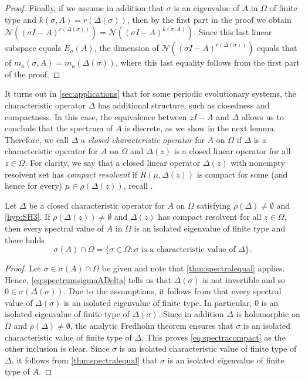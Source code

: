\documentclass[english]{myarticle}
\begin{document}
\begin{sloppypar}
\begin{proof}
Finally, if we assume in addition that $\sigma$ is an eigenvalue of $A$ in $\Omega$ of finite type and $k(\sigma,A) = r(\Delta(\sigma))$, then by the first part in the proof we obtain $\mathcal{N}((\sigma I - A)^{r(\Delta(\sigma))}) = \mathcal{N}((\sigma I - A)^{k(\sigma,A)})$. Since this last linear subspace equals $E_\sigma(A)$, the dimension of $\mathcal{N}((\sigma I - A)^{r(\Delta(\sigma))})$ equals that of $m_a(\sigma,A) = m_a(\Delta(\sigma))$, where this last equality follows from the first part of the proof.
\end{proof}
 
It turns out in \cref{sec:applications} that for some periodic evolutionary systems, the characteristic operator $\Delta$ has additional structure, such as closedness and compactness. In this case, the equivalence between $zI - A$ and $\Delta$ allows us to conclude that the spectrum of $A$ is discrete, as we show in the next lemma. Therefore, we call $\Delta$ a \emph{closed characteristic operator} for $A$ on $\Omega$ if $\Delta$ is a characteristic operator for $A$ on $\Omega$ and $\Delta(z)$ is a closed linear operator for all $z \in \Omega$. For clarity, we say that a closed linear operator $\Delta(z)$ with nonempty resolvent set has \emph{compact resolvent} if $R(\mu,\Delta(z))$ is compact for some (and hence for every) $\mu \in \rho(\Delta(z))$, recall \cite[Definition II.4.24]{Engel2000}.

\begin{lemma} \label{lemma:compactspectra}
Let $\Delta$ be a closed characteristic operator for $A$ on $\Omega$ satisfying $\rho(\Delta) \neq \emptyset$ and \ref{hyp:SH3}. If $\rho(\Delta(z)) \neq \emptyset$ and 
$\Delta(z)$ has compact resolvent for all $z \in \Omega$, 
then every spectral value of $A$ in $\Omega$ is an isolated eigenvalue of finite type and there holds
\begin{equation} \label{eq:spectracompact}
    \sigma(A) \cap \Omega = \{ \sigma \in \Omega :  \sigma \text{ is a characteristic value of } \Delta \}.
\end{equation}
\end{lemma}
\begin{proof} Let $\sigma \in \sigma(A) \cap \Omega$ be given and note that \cref{thm:spectralequal} applies. Hence, \eqref{eq:spectrumsigmaADelta} tells us that $\Delta(\sigma)$ is not invertible and so $0 \in \sigma(\Delta(\sigma))$. Due to the assumptions, it follows from \cite[Corollary IV.1.19]{Engel2000} that every spectral value of $\Delta(\sigma)$ is an isolated eigenvalue of finite type. In particular, $0$ is an isolated eigenvalue of finite type of $\Delta(\sigma)$. Since in addition $\Delta$ is holomorphic on $\Omega$ and $\rho(\Delta) \neq \emptyset$, the analytic Fredholm theorem \cite[Corollary XI.8.4]{Gohberg1990} ensures that $\sigma$ is an isolated characteristic value of finite type of $\Delta$. This proves \eqref{eq:spectracompact} as the other inclusion is clear. Since $\sigma$ is an isolated characteristic value of finite type of $\Delta$, it follows from \cref{thm:spectralequal} that $\sigma$ is an isolated eigenvalue of finite type of $A$.
\end{proof}


\end{sloppypar}
\end{document}
